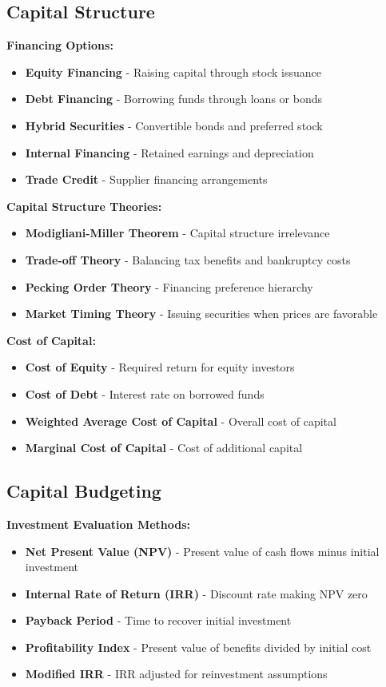 \documentclass[12pt]{article}
\begin{document}
\subsection{Capital Structure}

\textbf{Financing Options:}
\begin{itemize}
    \item \textbf{Equity Financing} - Raising capital through stock issuance
    \item \textbf{Debt Financing} - Borrowing funds through loans or bonds
    \item \textbf{Hybrid Securities} - Convertible bonds and preferred stock
    \item \textbf{Internal Financing} - Retained earnings and depreciation
    \item \textbf{Trade Credit} - Supplier financing arrangements
\end{itemize}

\textbf{Capital Structure Theories:}
\begin{itemize}
    \item \textbf{Modigliani-Miller Theorem} - Capital structure irrelevance
    \item \textbf{Trade-off Theory} - Balancing tax benefits and bankruptcy costs
    \item \textbf{Pecking Order Theory} - Financing preference hierarchy
    \item \textbf{Market Timing Theory} - Issuing securities when prices are favorable
\end{itemize}

\textbf{Cost of Capital:}
\begin{itemize}
    \item \textbf{Cost of Equity} - Required return for equity investors
    \item \textbf{Cost of Debt} - Interest rate on borrowed funds
    \item \textbf{Weighted Average Cost of Capital} - Overall cost of capital
    \item \textbf{Marginal Cost of Capital} - Cost of additional capital
\end{itemize}

\subsection{Capital Budgeting}

\textbf{Investment Evaluation Methods:}
\begin{itemize}
    \item \textbf{Net Present Value (NPV)} - Present value of cash flows minus initial investment
    \item \textbf{Internal Rate of Return (IRR)} - Discount rate making NPV zero
    \item \textbf{Payback Period} - Time to recover initial investment
    \item \textbf{Profitability Index} - Present value of benefits divided by initial cost
    \item \textbf{Modified IRR} - IRR adjusted for reinvestment assumptions
\end{itemize}
\end{document}
